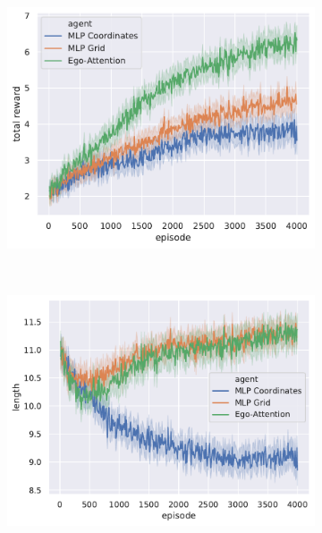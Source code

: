 \documentclass{article}
\begin{document}
{\begin{figure}[tp]
	\centering
	\begin{subfigure}[t]{.75\linewidth}
		\centering\includegraphics[width=\linewidth]{img/total_reward}
	\end{subfigure}
\\
	\begin{subfigure}[t]{.49\linewidth}
		\centering\includegraphics[width=\linewidth]{img/length}
	\end{subfigure}
	\begin{subfigure}[t]{.49\linewidth}

\end{subfigure}
\end{figure}}
\end{document}
